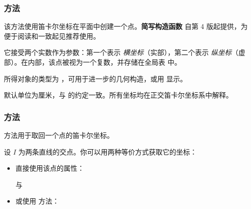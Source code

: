 \subsubsection{方法 }
\label{ssub:method_point_new}

该方法使用笛卡尔坐标在平面中创建一个点。\textbf{简写构造函数}  自第 4 版起提供，为便于阅读和一致起见推荐使用。

\medskip

它接受两个实数作为参数：第一个表示 \emph{横坐标}（实部），第二个表示 \emph{纵坐标}（虚部）。在内部，该点被视为一个复数，并存储在全局表  中。

\medskip

所得对象的类型为 ，可用于进一步的几何构造，或用  显示。

\medskip

 默认单位为厘米，与  的约定一致。所有坐标均在正交笛卡尔坐标系中解释。

\vspace{1em}

\begin{tkzexample}[latex = 7cm]
\end{tkzexample}

\subsubsection{方法 }
\label{ssub:method_point_get}

 方法用于取回一个点的笛卡尔坐标。

\medskip

设 $I$ 为两条直线的交点。你可以用两种等价方式获取它的坐标：
\begin{itemize}
  \item 直接使用该点的属性：
    \begin{center}
     \quad 与 \quad {}
    \end{center}
  \item 或使用  方法：
    \begin{center}
    \end{center}
\end{itemize}


